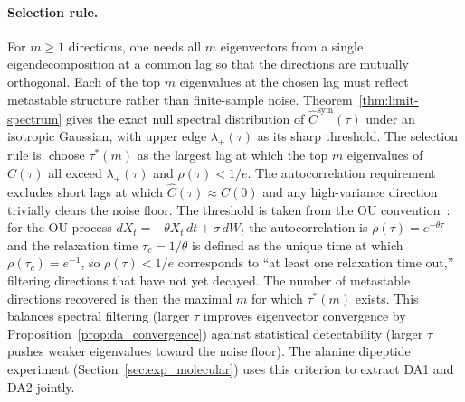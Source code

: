 \documentclass{article}
\begin{document}
\paragraph{Selection rule.}
For $m \geq 1$ directions, one needs all $m$ eigenvectors from a single
eigendecomposition at a common lag so that the directions are mutually
orthogonal. Each of the top $m$ eigenvalues at the chosen lag must
reflect metastable structure rather than finite-sample noise. Theorem~\ref{thm:limit-spectrum} gives the exact null spectral
distribution of $\hat C^{\mathrm{sym}}(\tau)$ under an isotropic Gaussian, with upper edge
$\lambda_+(\tau)$ as its sharp threshold. The selection rule is: choose $\tau^*(m)$ as the largest lag at
which the top $m$ eigenvalues of $\hat{C}(\tau)$ all exceed
$\lambda_+(\tau)$ and $\rho(\tau) < 1/e$. The autocorrelation
requirement excludes short lags at which
$\hat{C}(\tau) \approx \hat{C}(0)$ and any high-variance direction
trivially clears the noise floor. The threshold is taken from the
OU convention~\cite{Pavliotis2014}: for the OU process
$dX_t = -\theta X_t\,dt + \sigma\,dW_t$ the autocorrelation is
$\rho(\tau) = e^{-\theta \tau}$ and the relaxation time
$\tau_c = 1/\theta$ is defined as the unique time at which
$\rho(\tau_c) = e^{-1}$, so $\rho(\tau) < 1/e$ corresponds to ``at
least one relaxation time out,'' filtering directions that have not
yet decayed. The number of metastable directions recovered is then
the maximal $m$ for which $\tau^*(m)$ exists. This balances spectral
filtering (larger $\tau$ improves eigenvector convergence by
Proposition~\ref{prop:da_convergence}) against statistical
detectability (larger $\tau$ pushes weaker eigenvalues toward the
noise floor). The alanine dipeptide experiment
(Section~\ref{sec:exp_molecular}) uses this criterion to extract DA1
and DA2 jointly.
\end{document}
